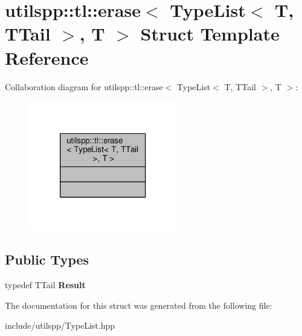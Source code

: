 \hypertarget{structutilspp_1_1tl_1_1erase_3_01TypeList_3_01T_00_01TTail_01_4_00_01T_01_4}{\section{utilspp\-:\-:tl\-:\-:erase$<$ Type\-List$<$ T, T\-Tail $>$, T $>$ Struct Template Reference}
\label{structutilspp_1_1tl_1_1erase_3_01TypeList_3_01T_00_01TTail_01_4_00_01T_01_4}
}


Collaboration diagram for utilspp\-:\-:tl\-:\-:erase$<$ Type\-List$<$ T, T\-Tail $>$, T $>$\-:
\nopagebreak
\begin{figure}[H]
\begin{center}
\leavevmode
\includegraphics[width=184pt]{structutilspp_1_1tl_1_1erase_3_01TypeList_3_01T_00_01TTail_01_4_00_01T_01_4__coll__graph}
\end{center}
\end{figure}
\subsection*{Public Types}
\begin{DoxyCompactItemize}
\item 
\hypertarget{structutilspp_1_1tl_1_1erase_3_01TypeList_3_01T_00_01TTail_01_4_00_01T_01_4_af3a261a3a865799a2b34bb7521d350c6}{typedef T\-Tail {\bfseries Result}}\label{structutilspp_1_1tl_1_1erase_3_01TypeList_3_01T_00_01TTail_01_4_00_01T_01_4_af3a261a3a865799a2b34bb7521d350c6}

\end{DoxyCompactItemize}


The documentation for this struct was generated from the following file\-:\begin{DoxyCompactItemize}
\item 
include/utilspp/Type\-List.\-hpp\end{DoxyCompactItemize}

